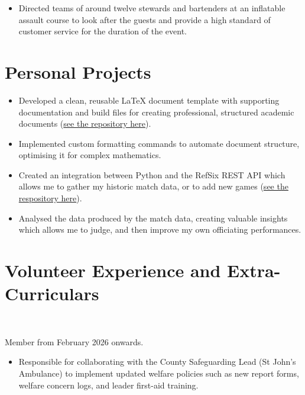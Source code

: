 \begin{itemize}
    \item Directed teams of around twelve stewards and bartenders at an inflatable assault course to look after the guests and provide a high standard of customer service for the duration of the event.
\end{itemize}

\section*{Personal Projects}

\begin{itemize}
    \item Developed a clean, reusable LaTeX document template with supporting documentation and build files for creating professional, structured academic documents (\href{https://github.com/MatthewEmer/LaTeX-File-Template}{see the repository here}).
    \item Implemented custom formatting commands to automate document structure, optimising it for complex mathematics.
\end{itemize}

\begin{itemize}
    \item Created an integration between Python and the RefSix REST API which allows me to gather my historic match data, or to add new games (\href{https://github.com/MatthewEmer/REFSIX-Data}{see the respository here}).
    \item Analysed the data produced by the match data, creating valuable insights which allows me to judge, and then improve my own officiating performances.
\end{itemize}

\section*{Volunteer Experience and Extra-Curriculars}

\\\begin{small}Member from February 2026 onwards.\end{small}
\begin{itemize}
    \item Responsible for collaborating with the County Safeguarding Lead (St John's Ambulance) to implement updated welfare policies such as new report forms, welfare concern logs, and leader first-aid training.
\end{itemize}

